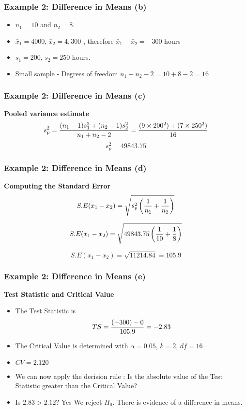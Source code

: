 
\begin{frame}
\frametitle{Example 2: Difference in Means (b) }
\begin{itemize}\item $n_1 = 10$ and $n_2 = 8$.
\item $\bar{x}_1 = 4000$, $\bar{x}_2 = 4,300 $ , therefore  $\bar{x}_1 - \bar{x}_2 = -300$ hours
\item $s_1  = 200$, $s_2 = 250$ hours.
\item Small sample - Degrees of freedom $n_1 + n_2 - 2 = 10 + 8 - 2 = 16$
\end{itemize}\end{frame}
\begin{frame}
\frametitle{Example 2: Difference in Means (c) }
\textbf{Pooled variance estimate}
\[ s^2_p = {(n_1 - 1)s^2_1  + (n_2 - 1)s^2_ 2\over n_1 + n_2 - 2 } = {(9 \times 200^2 ) +( 7 \times 250^2) \over 16 }  \]
\[ s^2_p  = 49843.75 \]
\end{frame}

\begin{frame}
\frametitle{Example 2: Difference in Means (d) }
\textbf{Computing the Standard Error}
\[ S.E(x_1 - x_2) = \sqrt{s^2_p \left({1\over n_1}+{1\over n_2} \right)}\]

\[ S.E(x_1 - x_2) = \sqrt{49843.75 \left({1\over 10}+{1\over 8} \right)}\]

\[ S.E(x_1 - x_2) = \sqrt{11214.84} = 105.9\]

\end{frame}

\begin{frame}
\frametitle{Example 2: Difference in Means (e) }
\textbf{Test Statistic and Critical Value}\\
\begin{itemize}
\item The Test Statistic is \[ TS  = {(-300) - 0 \over 105.9}  = -2.83 \]
\item The Critical Value is determined with $\alpha = 0.05$, $k=2$, $df = 16 $
\item $CV = 2.120$
\item We can now apply the decision rule : Is the absolute value of the Test Statistic greater than the Critical Value?
\item Is $2.83 > 2.12$? Yes We reject $H_0$. There is evidence of a difference in means.
\end{itemize}
\end{frame}


